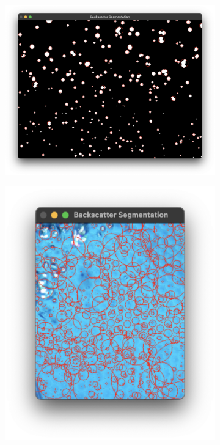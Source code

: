\begin{figure}[H]
    \centering
    \begin{subfigure}{.43\textwidth}
        \centering
        \includegraphics[width=1\linewidth]{assets/sys_sim.png}
        \caption{}
        \label{fig:sys_sim}
    \end{subfigure}
    \hfill
    \begin{subfigure}{.25\textwidth}
        \centering
        \includegraphics[width=1\linewidth]{assets/sys_histequ.png}

\end{subfigure}
\end{figure}
